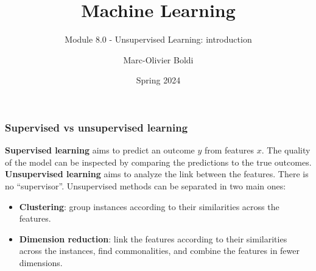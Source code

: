 
\title{Machine Learning}
\subtitle{Module 8.0 - Unsupervised Learning: introduction}
\author[MOB]{Marc-Olivier Boldi}
\date[Spring 2024]{Spring 2024}

\begin{frame}
  \titlepage
\end{frame}
\begin{frame}
\frametitle{Supervised vs unsupervised learning}
{\bf Supervised learning} aims to predict an outcome $y$ from features $x$. The quality of the model can be inspected by comparing the predictions to the true outcomes.\\
\vspace{0.3cm}
{\bf Unsupervised learning} aims to analyze the link between the features. There is no ``supervisor''. Unsupervised methods can be separated in two main ones:
\begin{itemize}
\item {\bf Clustering}: group instances according to their similarities across the features.
\item {\bf Dimension reduction}: link the features according to their similarities across the instances, find commonalities, and combine the features in fewer dimensions. 
\end{itemize}
\end{frame}

